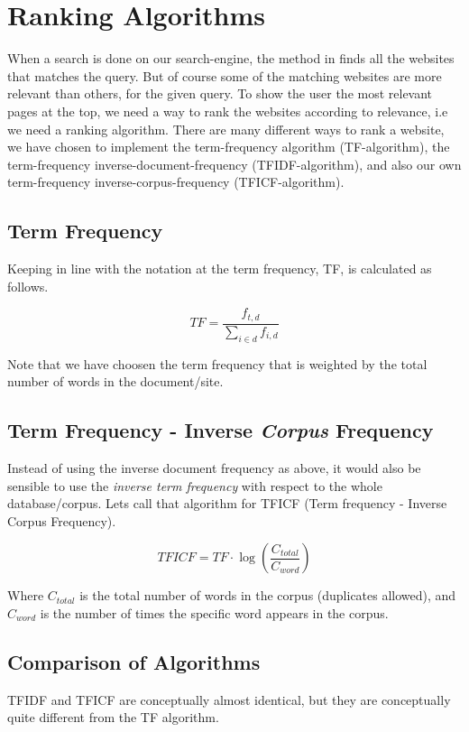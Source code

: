 \section{Ranking Algorithms}
\label{sec:rankingAlgorithms}
When a search is done on our search-engine, the method  in  finds all the websites that matches the query. But of course some of the matching websites are more relevant than others, for the given query. To show the user the most relevant pages at the top, we need a way to rank the websites according to relevance, i.e we need a ranking algorithm. There are many different ways to rank a website, we have chosen to implement the term-frequency algorithm (TF-algorithm), the term-frequency inverse-document-frequency (TFIDF-algorithm), and also our own  term-frequency inverse-corpus-frequency (TFICF-algorithm).    

\subsection{Term Frequency}
Keeping in line with the notation at \cite{wikiTFIDF} the term frequency, TF, is calculated as follows.

\[ TF = \frac{f_{t,d}}{\sum_{i \in d}f_{i,d}} \]

Note that we have choosen the term frequency that is weighted by the total number of words in the document/site. %




\subsection{Term Frequency - Inverse \emph{Corpus} Frequency}
Instead of using the inverse document frequency as above, it would also be sensible to use the \emph{inverse term frequency} with respect to the whole database/corpus. Lets call that algorithm for TFICF (Term frequency - Inverse Corpus Frequency).
    
\[ TFICF = TF \cdot \log{\left( \frac{C_{total}}{C_{word}} \right) } \]

Where \(C_{total}\) is the total number of words in the corpus (duplicates allowed), and \(C_{word}\) is the number of times the specific word appears in the corpus. 



\subsection{Comparison of Algorithms}
TFIDF and TFICF are conceptually almost identical, but they are conceptually quite different from the TF algorithm. 

